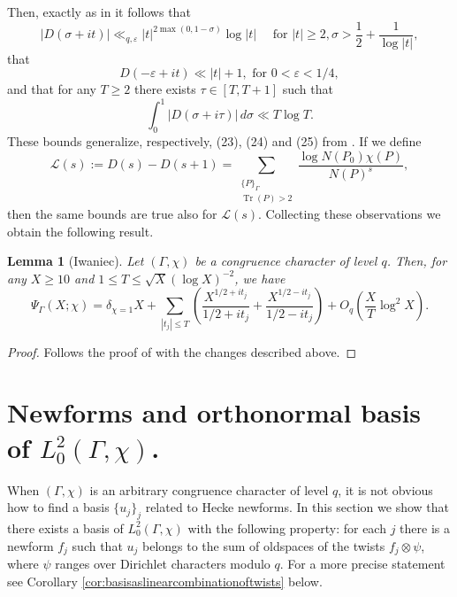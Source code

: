 \documentclass{article}
\newtheorem{lem}[thm]{Lemma}
\theoremstyle{named}
\renewcommand{\L}{\mathcal{L}}
\DeclareMathOperator{\Tr}{Tr}
\begin{document}
Then, exactly as in \cite[section 3]{Iwaniec1984} it follows that 
\begin{equation*}
    |D(\sigma + it)| \ll_{q, \varepsilon} |t|^{2\max(0, 1-\sigma)} \log|t| \quad \text{ for }|t| \geq 2, \sigma > \frac{1}{2} + \frac{1}{\log |t|},
\end{equation*}
that
\begin{equation*}
    D(-\varepsilon + it) \ll |t| + 1, \text{ for } 0 < \varepsilon < 1/4,
\end{equation*}
and that for any $T \geq 2$ there exists $\tau \in [T, T + 1]$ such that 
\begin{equation*}
    \int_0^1 |D(\sigma + i\tau)| \, d\sigma \ll T\log T.
\end{equation*}
These bounds generalize, respectively, (23), (24) and (25) from \cite{Iwaniec1984}. If we define 
\begin{equation*}
    \L(s) := D(s) - D(s + 1) = \sum_{\substack{\{P\}_\Gamma\\
    \Tr(P) > 2}} \frac{\log N(P_0)\chi(P)}{N(P)^s},
\end{equation*}
then the same bounds are true also for $\L(s)$. Collecting these observations we obtain the following result.

\begin{lem}[Iwaniec]\label{lem:iwaniecslemma}
Let $(\Gamma, \chi)$ be a congruence character of level $q$. Then, for any $X \geq 10$ and $1 \leq T \leq \sqrt{X}(\log X)^{-2}$, we have
\begin{equation*}
    \Psi_\Gamma(X; \chi) = \delta_{\chi = 1} X + \sum_{|t_j|\leq T}\left(\frac{X^{1/2 + it_j}}{1/2 + it_j} + \frac{X^{1/2 -it_j}}{1/2 - it_j}\right) + O_q\left(\frac{X}{T}\log^2 X\right).
\end{equation*}
\end{lem}
\begin{proof}
Follows the proof of \cite[Lemma 1]{Iwaniec1984} with the changes described above.
\end{proof}






\section{Newforms and orthonormal basis of $L_0^2(\Gamma, \chi)$.}\label{sec:orthonormalbasis}
When $(\Gamma, \chi)$ is an arbitrary congruence character of level $q$, it is not obvious how to find a basis $\{u_j\}_j$ related to Hecke newforms. In this section we show that there exists a basis of $L_0^2(\Gamma, \chi)$ with the following property: for each $j$ there is a newform $f_j$ such that $u_j$ belongs to the sum of oldspaces of the twists $f_j \otimes \psi$, where $\psi$ ranges over Dirichlet characters modulo $q$. For a more precise statement see Corollary \ref{cor:basisaslinearcombinationoftwists} below. 
\end{document}
